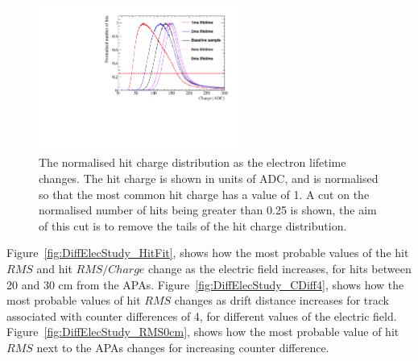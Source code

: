 \begin{figure}
  \centering
  \includegraphics[width=0.6\textwidth]{Canvas_ChargeCut_ElecLifetime}
  \caption[The normalised hit charge distribution as the electron lifetime changes]
          {The normalised hit charge distribution as the electron lifetime changes. The hit charge is shown in units of ADC, and is normalised so that the most common hit charge has a value of 1. A cut on the normalised number of hits being greater than 0.25 is shown, the aim of this cut is to remove the tails of the hit charge distribution.}
  \label{fig:DiffLifeStudy_ChargeCut}
\end{figure}

Figure~\ref{fig:DiffElecStudy_HitFit}, shows how the most probable values of the hit $RMS$ and hit $RMS/Charge$ change as the electric field increases, for hits between 20 and 30 cm from the APAs. Figure~\ref{fig:DiffElecStudy_CDiff4}, shows how the most probable values of hit $RMS$ changes as drift distance increases for track associated with counter differences of 4, for different values of the electric field. Figure~\ref{fig:DiffElecStudy_RMS0cm}, shows how the most probable value of hit $RMS$ next to the APAs changes for increasing counter difference. \\

